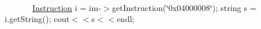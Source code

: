 ~\newline
~\newline
~\newline
~\newline
~\newline
~\newline
~\newline
~\newline
~\newline
~\newline
~\newline
~\newline
~\newline
~\newline
~\newline
~\newline
~\newline
~\newline
~\newline
~\newline
~\newline
~\newline
~\newline
~\newline
~\newline
~\newline
~\newline
~\newline
~\newline
~\newline
~\newline
~\newline
~\newline
~\newline
~\newline
~\newline
~\newline
~\newline
~\newline
~\newline
~\newline
~\newline
~\newline
~\newline
~\newline
~\newline
~\newline
 \mbox{\hyperlink{class_instruction}{Instruction}} i = im-\/$>$get\+Instruction(\char`\"{}0x04000008\char`\"{}); string s = i.\+get\+String(); cout$<$$<$s$<$$<$endl; ~\newline
~\newline
